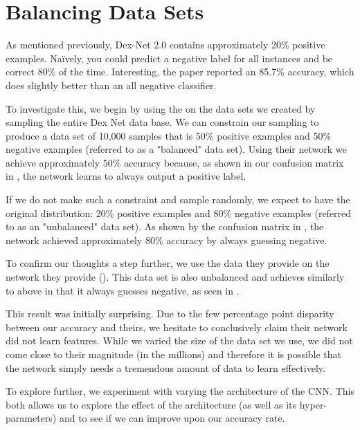 
\section{Balancing Data Sets}
\label{sec:balance}

As mentioned previously, Dex-Net 2.0 contains approximately 20\% positive examples. 
Na{\"i}vely, you could predict a negative label for all instances and be correct 80\% of the time. Interesting, the paper reported an 85.7\% accuracy, which does slightly better than an all negative classifier. 

To investigate this, we begin by using the  on the data sets we created by sampling the entire Dex Net data base. 
We can constrain our sampling to produce a data set of 10,000 samples that is 50\% positive examples and 50\% negative examples (referred to as a "balanced" data set). 
Using their network we achieve approximately 50\% accuracy because, as shown in our confusion matrix in , the network learns to always output a positive label. 

If we do not make such a constraint and sample randomly, we expect to have the original distribution: 20\% positive examples and 80\% negative examples (referred to as an "unbalanced" data set). 
As shown by the confusion matrix in , the network achieved approximately 80\% accuracy by always guessing negative. 

To confirm our thoughts a step further, we use the data they provide on the network they provide (). 
This data set is also unbalanced and achieves similarly to above in that it always guesses negative, as seen in . 

This result was initially surprising. 
Due to the few percentage point disparity between our accuracy and theirs, we hesitate to conclusively claim their network did not learn features. 
While we varied the size of the data set we use, we did not come close to their magnitude (in the millions) and therefore it is possible that the network simply needs a tremendous amount of data to learn effectively. 

To explore further, we experiment with varying the architecture of the CNN. 
This both allows us to explore the effect of the architecture (as well as its hyper-parameters) and to see if we can improve upon our accuracy rate. 

